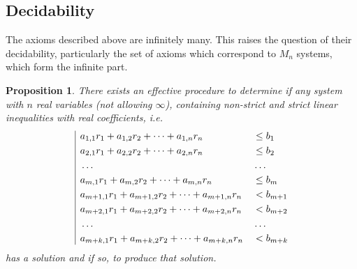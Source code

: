 \documentclass{article}
\newtheorem*{proposition}{Proposition}
\begin{document}
\subsection{Decidability}
The axioms described above are infinitely many. This raises the question of their decidability, particularly the set of axioms which correspond to $M_n$ systems, which form the infinite part.

\begin{proposition}
  There exists an effective procedure to determine if any system with $n$ real variables (not allowing $\infty$), containing non-strict and strict linear inequalities with real coefficients, i.e.
  \[
  \begin{array}{|l@{}}
    \begin{aligned}
      &a_{1, 1}r_1 + a_{1, 2}r_2 + \dots + a_{1, n}r_n &&\leq b_1 \\
      &a_{2, 1}r_1 + a_{2, 2}r_2 + \dots + a_{2, n}r_n &&\leq b_2 \\
      &\dots&&\dots \\
      &a_{m, 1}r_1 + a_{m, 2}r_2 + \dots + a_{m, n}r_n &&\leq b_m \\
      &a_{m+1, 1}r_1 + a_{m+1, 2}r_2 + \dots + a_{m+1, n}r_n &&< b_{m+1} \\
      &a_{m+2, 1}r_1 + a_{m+2, 2}r_2 + \dots + a_{m+2, n}r_n &&< b_{m+2} \\
      &\dots&&\dots \\
      &a_{m+k, 1}r_1 + a_{m+k, 2}r_2 + \dots + a_{m+k, n}r_n &&< b_{m+k}
    \end{aligned}
  \end{array}
  \]
  has a solution and if so, to produce that solution.
\end{proposition}
\end{document}
